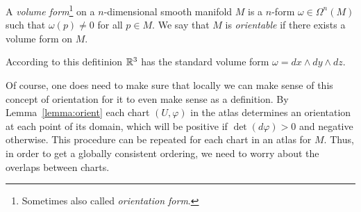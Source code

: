 \begin{definition}
  A \emph{volume form}\footnote{Sometimes also called \emph{orientation form}.} on a $n$-dimensional smooth manifold $M$ is a $n$-form $\omega\in\Omega^n(M)$ such that $\omega(p) \neq 0$ for all $p\in M$.
  We say that $M$ is \emph{orientable} if there exists a volume form on $M$.
\end{definition}

\begin{example}
  According to this defitinion $\mathbb{R}^3$ has the standard volume form $\omega = dx \wedge dy \wedge dz$.
\end{example}

Of course, one does need to make sure that locally we can make sense of this concept of orientation for it to even make sense as a definition.
  By Lemma~\ref{lemma:orient} each chart $(U, \varphi)$ in the atlas determines an orientation at each point of its domain, which will be positive if $\det(d\varphi)>0$ and negative otherwise.
  This procedure can be repeated for each chart in an atlas for $M$.
  Thus, in order to get a globally consistent ordering, we need to worry about the overlaps between charts.

